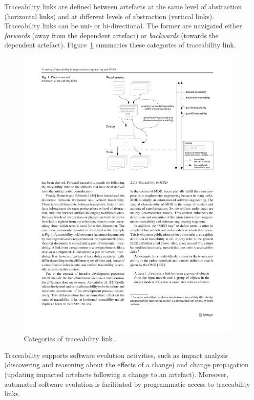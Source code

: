 Traceability links are defined between artefacts at the same level of abstraction (horizontal links) and at different levels of abstraction (vertical links). Traceability links can be uni- or bi-directional. The former are navigated either \emph{forwards} (away from the dependent artefact) or \emph{backwards} (towards the dependent artefact). Figure~\ref{fig:traceability_links} summaries these categories of traceability link.

\begin{figure}[htbp]
  \begin{center}
    \leavevmode
    \includegraphics[width=11.5cm]{3.LiteratureReview/images/traceability_links.pdf}
  \end{center}
  \caption[Categories of traceability link]{Categories of traceability link \cite{winkler09survey}.}
  \label{fig:traceability_links}
\end{figure}

Traceability supports software evolution activities, such as impact analysis (discovering and reasoning about the effects of a change) and change propagation (updating impacted artefacts following a change to an artefact). Moreover, automated software evolution is facilitated by programmatic access to traceability links.

